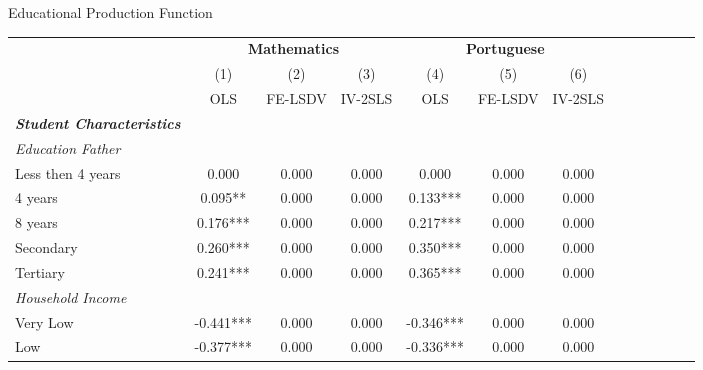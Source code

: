 \documentclass{beamer}
\begin{document}
\begin{frame}{Educational Production Function}
\vspace{-27pt} \flushright \hyperlink{Mirror}{\beamerbutton{\textcolor{red}{Mirror}}}
\vspace{15pt}
\begin{table}
\begin{adjustbox}{max width=\textwidth} 
\begin{tabular}{l*{6}{cc}}
\toprule
& \multicolumn{3}{c}{\textbf{Mathematics}} &                      \multicolumn{3}{c}{\textbf{Portuguese}} \\            \cline{2-4}              \cline{5-7}                    
                    &\multicolumn{1}{c}{(1)}   &\multicolumn{1}{c}{(2)}   &\multicolumn{1}{c}{(3)}   &\multicolumn{1}{c}{(4)}   &\multicolumn{1}{c}{(5)}   &\multicolumn{1}{c}{(6)}   \\
                    &         OLS   &     FE-LSDV   &     IV-2SLS   &         OLS   &     FE-LSDV   &     IV-2SLS   \\
\midrule
\textbf{\emph{Student Characteristics}}&               &               &               &               &               &               \\
\emph{Education Father}&               &               &               &               &               &               \\
Less then 4 years   &       0.000   &       0.000   &       0.000   &       0.000   &       0.000   &       0.000   \\
4 years             &       0.095** &       0.000   &       0.000   &       0.133***&       0.000   &       0.000   \\
8 years             &       0.176***&       0.000   &       0.000   &       0.217***&       0.000   &       0.000   \\
Secondary           &       0.260***&       0.000   &       0.000   &       0.350***&       0.000   &       0.000   \\
Tertiary            &       0.241***&       0.000   &       0.000   &       0.365***&       0.000   &       0.000   \\
\emph{Household Income}&               &               &               &               &               &               \\
Very Low            &      -0.441***&       0.000   &       0.000   &      -0.346***&       0.000   &       0.000   \\
Low                 &      -0.377***&       0.000   &       0.000   &      -0.336***&       0.000   &       0.000   \\

\end{tabular}
\end{adjustbox}
\end{table}
\end{frame}
\end{document}
